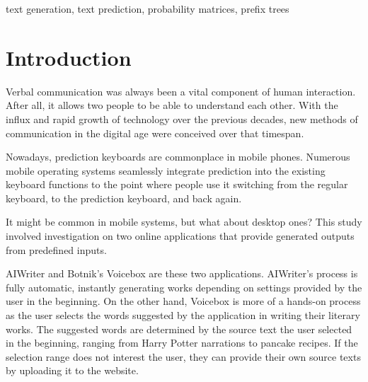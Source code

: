 \documentclass[journal]{./IEEE/IEEEtran}
\title{\SPTITLE}
\author{\ADVISEE~and~\ADVISER
\REMARK
}
\begin{document}
\maketitle

\begin{abstract}
With the advent of the digital age, communication has evolved to a point where technology is seamlessly integrated into day-to-day conversation. Primarily found in mobile phones, text prediction systems involves streamlining the communication by providing users with suggested words that they can select, based on the previous word they provided. This study aims to implement a similar technology, embedded in an application developed for the Chrome browser to provide the power of text prediction in desktop environments, in an application most users use in their day-to-day lives. The predictor was developed using various representations of the text input, where probability matrices and prefix trees provide the most importance.
\end{abstract}

\begin{keywords}
text generation, text prediction, probability matrices, prefix trees
\end{keywords}

\section{Introduction}
Verbal communication was always been a vital component of human interaction. After all, it allows two people to be able to understand each other. With the influx and rapid growth of technology over the previous decades, new methods of communication in the digital age were conceived over that timespan.

Nowadays, prediction keyboards are commonplace in mobile phones. Numerous mobile operating systems seamlessly integrate prediction into the existing keyboard functions to the point where people use it switching from the regular keyboard, to the prediction keyboard, and back again.

It might be common in mobile systems, but what about desktop ones? This study involved investigation on two online applications that provide generated outputs from predefined inputs.

AIWriter\cite{AIWriter} and Botnik's Voicebox are these two applications. AIWriter's process is fully automatic, instantly generating works depending on settings provided by the user in the beginning. On the other hand, Voicebox is more of a hands-on process as the user selects the words suggested by the application in writing their literary works. The suggested words are determined by the source text the user selected in the beginning, ranging from Harry Potter narrations to pancake recipes. If the selection range does not interest the user, they can provide their own source texts by uploading it to the website.
\end{document}
